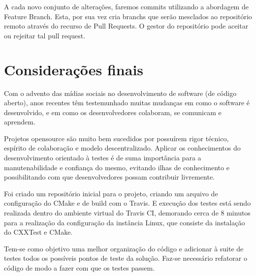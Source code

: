 \documentclass[
	article,			%
	12pt,				%
	oneside,			%
	a4paper,			%
	english,			
	brazil,
	sumario=tradicional
	]{abntex2}
\begin{document}
A cada novo conjunto de alterações, faremos commits utilizando a abordagem de Feature Branch. Esta, por sua vez cria branchs que serão mesclados ao repositório remoto através do recurso de Pull Requests. O gestor do repositório pode aceitar ou rejeitar tal pull request.




% 

\pagebreak
\section*{Considerações finais}
Com o advento das mídias sociais no desenvolvimento de software (de código aberto), anos recentes têm testemunhado muitas mudanças em como o software é desenvolvido, e em como os desenvolvedores colaboram, se comunicam e aprendem.

Projetos opensource são muito bem sucedidos por possuírem rigor técnico, espírito de colaboração e modelo descentralizado. Aplicar os conhecimentos do desenvolvimento orientado à testes é de suma importância para a manutenabilidade e confiança do mesmo, evitando ilhas de conhecimento e possibilitando com que desenvolvedores possam contribuir livremente.

Foi criado um repositório inicial para o projeto, criando um arquivo de configuração do CMake e de build com o Travis. E execução dos testes está sendo realizada dentro do ambiente virtual do Travis CI, demorando cerca de 8 minutos para a realização da configuração da instância Linux, que consiste da instalação do CXXTest e CMake.

Tem-se como objetivo uma melhor organização do código e adicionar à suite de testes todos os possíveis pontos de teste da solução. Faz-se necessário refatorar o código de modo a fazer com que os testes passem. 
\end{document}
